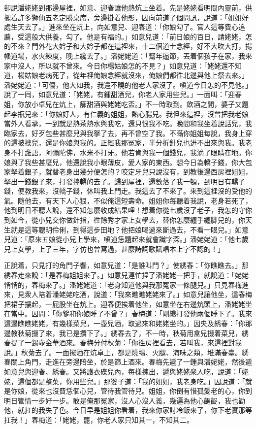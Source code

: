 卻說潘姥姥到那邊屋裡，如意、迎春讓他熱炕上坐着。先是姥姥看明間內靈前，供擺着許多獅仙五老定勝桌席，旁邊掛着他影，因向前道了個問訊，說道：「姐姐好處生天去了。」進來坐在炕上，向如意兒、迎春道：「你娘勾了。官人這等費心追薦，受這般大供養，勾了。他是有福的。」{}如意兒道：「前日娘的百日，請姥姥，怎的不來？門外花大妗子和大妗子都在這裡來，十二個道士念經，好不大吹大打，揚幡道場，水火練度，晚上纔去了。」潘姥姥道：「幫年逼節，丟着個孩子在家，我來家中沒人，所以就不曾來。今日你楊姑娘怎的不見？」如意兒道：「姥姥還不知道，楊姑娘老病死了，從年裡俺娘念經就沒來，俺娘們都徃北邊與他上祭去來。」潘姥姥道：「可傷，他大如我，我還不曉的他老人家沒了。嗔道今日怎的不見他。」說了一囘，如意兒道：「姥姥，有鍾甜酒兒，你老人家用些兒。」一面叫：「迎春姐，你放小卓兒在炕上，篩甜酒與姥姥吃盃。」不一時取到。飲酒之間，婆子又題起李瓶兒來：「你娘好人，有仁義的姐姐，熱心腸兒。{}我但來這裡，沒曾把我老娘當外人看承，一到就是熱茶熱水與我吃，還只恨我不吃。晚間和我坐着說話兒，我臨家去，好歹包些甚麼兒與我拏了去，再不曾空了我。不瞞你姐姐每說，我身上穿的這披襖兒，還是你娘與我的。{}正經我那冤家，半分折針兒也迸不出來與我。我老身不打誑語，阿彌陀佛，{}水米不打牙。他若肯與我一個錢兒，我滴了眼睛在地。你娘與了我些甚麼兒，他還說我小眼薄皮，愛人家的東西。想今日為轎子錢，你大包家拏着銀子，就替老身出幾分便怎的？咬定牙兒只說沒有，到教後邊西房裡姐姐，拏出一錢銀子來，打發擡轎的去了。歸到屋裡，還數落了我一頓，到明日有轎子錢，便教我來，沒轎子錢，休叫我上門走。我這去了不來了。{}來到這裡沒的受他的氣。隨他去，有天下人心狠，不似俺這短壽命。姐姐你每聽着我說，老身若死了，他到明日不聽人說，還不知怎麼收成結果哩！{}想着你從七歲沒了老子，我怎的守你到如今，從小兒交你做針指，徃餘秀才家上女學去，替你怎麼纏手纏脚兒的，你天生就是這等聰明伶俐，到得這步田地？他把娘喝過來斷過去，不看一眼兒。」如意兒道：「原來五娘從小兒上學來，嗔道恁題起來就會識字深。」潘姥姥道：「他七歲兒上女學，上了三年，字仿也曾寫過，甚麼詩詞歌賦唱本上字不認的！」

正說着，只見打的角門子響，如意兒道：「是誰叫門？」使綉春：「你瞧瞧去。」那綉春走來說：「是春梅姐姐來了。」如意兒連忙捏了潘姥姥一把手，{}就說道：「姥姥悄悄的，春梅來了。」潘姥姥道：「老身知道他與我那冤家一條腿兒。」只見春梅進來，見衆人陪着潘姥姥吃酒，說道：「我來瞧瞧姥姥來了。」如意兒讓他坐，這春梅把裙子摟起，一屁股坐在炕上。迎春便挨着他坐，如意坐在右邊炕頭上，潘姥姥坐在當中。因問：「你爹和你娘睡了不曾？」春梅道：「剛纔打發他兩個睡下了。我來這邊瞧瞧姥姥，有幾樣菜兒，一壺兒酒，取過來和姥姥坐的。」因央及綉春：「你那邊教秋菊掇了來，我已是攢下了。」綉春去了，不一時，秋菊用盒兒掇着菜兒，綉春提了一錫壺金華酒來。春梅分付秋菊：「你徃房裡看去，若叫我，來這裡對我說。」秋菊去了。一面擺酒在炕卓上，都是燒鴨、火腿、海味之類，堆滿春臺。綉春關上角門，走進在旁邊陪坐，於是篩上酒來。春梅先遞了一鍾與潘姥姥，然後遞如意兒與迎春、綉春。又將護衣碟兒內，每樣揀出，遞與姥姥衆人吃，說道：「姥姥，這個都是整菜，你用些兒。」那婆子道：「我的姐姐，我老身吃。」因說道：「就是你娘，從來也沒費恁個心兒，管待我管待兒。姐姐，你倒有惜孤愛老的心，你到明日管情一步好一步。敢是俺那冤家，沒人心沒人義，幾遍為他心齷齪，我也勸他，就扛的我失了色。今日早是姐姐你看着，我來你家討冷飯來了，你下老實那等扛我！」春梅道：「姥姥，罷，你老人家只知其一，不知其二。

